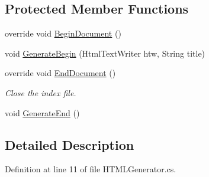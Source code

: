 \subsection*{Protected Member Functions}
\begin{DoxyCompactItemize}
\item 
override void \hyperlink{class_software_engineering_tools_1_1_documentation_1_1_h_t_m_l_generator_ab9828a528be4027dc37c6f674a40e007}{Begin\+Document} ()
\item 
void \hyperlink{class_software_engineering_tools_1_1_documentation_1_1_h_t_m_l_generator_a09fe3f4c3a055d88f50bd281344c5ca6}{Generate\+Begin} (Html\+Text\+Writer htw, String title)
\item 
override void \hyperlink{class_software_engineering_tools_1_1_documentation_1_1_h_t_m_l_generator_af1190908a9867c982c993ab8a596435b}{End\+Document} ()
\begin{DoxyCompactList}\small\item\em Close the index file. \end{DoxyCompactList}\item 
void \hyperlink{class_software_engineering_tools_1_1_documentation_1_1_h_t_m_l_generator_a80935a88a81e9889b566e367f8f8ef97}{Generate\+End} ()
\end{DoxyCompactItemize}


\subsection{Detailed Description}


Definition at line 11 of file H\+T\+M\+L\+Generator.\+cs.



